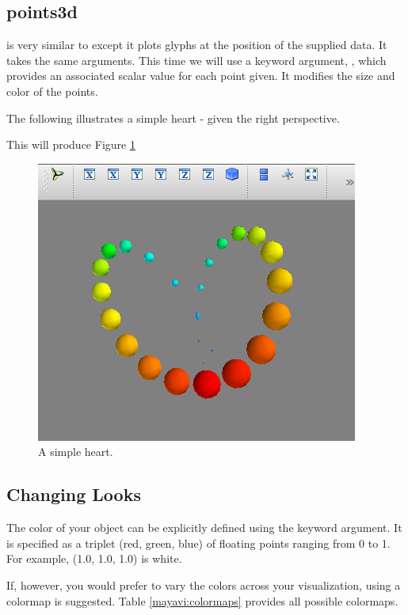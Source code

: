 \subsection*{points3d}
 is very similar to  except it plots glyphs at the 
position of the supplied data. It takes the same arguments. This time we 
will use a keyword argument, , which provides an associated scalar 
value for each point given. It modifies the size and color of the points. 

The following illustrates a simple heart - given the right perspective. 



This will produce Figure \ref{mayavi:points3d.pdf}

\begin{figure} 
\includegraphics[width=\textwidth]{points3d.pdf}
\caption{A simple heart. } 
\label{mayavi:points3d.pdf}
\end{figure}

\subsection*{Changing Looks}
The color of your object can be explicitly defined using the  
keyword argument. It is specified as a triplet (red, green, blue) of 
floating points ranging from 0 to 1. 
For example, (1.0, 1.0, 1.0) is white. 

If, however, you would prefer to vary the colors across your visualization, 
using a colormap is suggested. Table \ref{mayavi:colormaps} provides 
all possible colormaps. 

